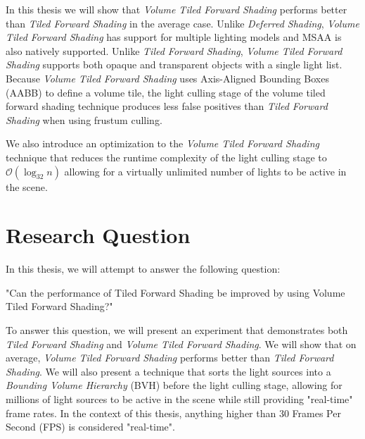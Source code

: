 In this thesis we will show that \emph{Volume Tiled Forward Shading} performs better than \emph{Tiled Forward Shading} in the average case. Unlike \emph{Deferred Shading}, \emph{Volume Tiled Forward Shading} has support for multiple lighting models and MSAA is also natively supported. Unlike \emph{Tiled Forward Shading}, \emph{Volume Tiled Forward Shading} supports both opaque and transparent objects with a single light list. Because \emph{Volume Tiled Forward Shading} uses Axis-Aligned Bounding Boxes (AABB) to define a volume tile, the light culling stage of the volume tiled forward shading technique produces less false positives than \emph{Tiled Forward Shading} when using frustum culling.

We also introduce an optimization to the \emph{Volume Tiled Forward Shading} technique that reduces the runtime complexity of the light culling stage to $\mathcal{O}(\log_{32}n)$ allowing for a virtually unlimited number of lights to be active in the scene.


\section{Research Question}

In this thesis, we will attempt to answer the following question:

"Can the performance of Tiled Forward Shading be improved by using Volume Tiled Forward Shading?"

To answer this question, we will present an experiment that demonstrates both \emph{Tiled Forward Shading} and \emph{Volume Tiled Forward Shading}. We will show that on average, \emph{Volume Tiled Forward Shading} performs better than \emph{Tiled Forward Shading}. We will also present a technique that sorts the light sources into a \emph{Bounding Volume Hierarchy} (BVH) before the light culling stage, allowing for millions of light sources to be active in the scene while still providing "real-time" frame rates. In the context of this thesis, anything higher than 30 Frames Per Second (FPS) is considered "real-time".